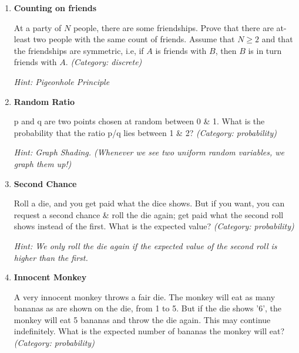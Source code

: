 \begin{enumerate}

\item \textbf{Counting on friends}

At a party of $N$ people, there are some friendships. Prove that there are at-least two people with the same count of friends.
Assume that $N \ge 2$ and that the friendships are symmetric, i.e, if $A$ is friends with $B$, then $B$ is in turn friends with $A$.
\small\emph{(Category: discrete)}

\small\emph{Hint: Pigeonhole Principle}





\item \textbf{Random Ratio}

p and q are two points chosen at random between 0 \& 1. What is the probability that the ratio p/q lies between 1 \& 2?
\small\emph{(Category: probability)}

\small\emph{Hint: Graph Shading. (Whenever we see two uniform random variables, we graph them up!)}





\item \textbf{Second Chance}

Roll a die, and you get paid what the dice shows. But if you want, you can request a second chance \& roll the die again; get paid what the second roll shows instead of the first. What is the expected value?
\small\emph{(Category: probability)}

\small\emph{Hint: We only roll the die again if the expected value of the second roll is higher than the first.}





\item \textbf{Innocent Monkey}

A very innocent monkey throws a fair die. The monkey will eat as many bananas as are shown on the die, from 1 to 5. But if the die shows '6', the monkey will eat 5 bananas and throw the die again. This may continue indefinitely. What is the expected number of bananas the monkey will eat?
\small\emph{(Category: probability)}


\end{enumerate}
